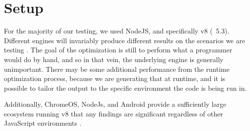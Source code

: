 \section{Setup}

For the majority of our testing, we used NodeJS, and specifically v8 (~5.3). Different engines will invariably produce different results on the scenarios we are testing \cite{engineperf16}.  The goal of the optimization is still to perform what a programmer would do by hand, and so in that vein, the underlying engine is generally unimportant.  There may be some additional performance from the runtime optimization process, because we are generating that at runtime, and it is possible to tailor the output to the specific environment the code is being run in.

Additionally, ChromeOS, NodeJs, and Android provide a sufficiently large ecosystem running v8 that any findings are significant regardless of other JavaScript environments \cite{statcounter16}.

